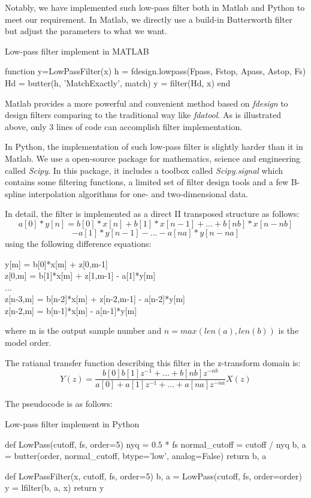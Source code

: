 \documentclass[conference]{IEEEtran}
\begin{document}
Notably, we have implemented such low-pass filter both in Matlab and Python to meet our requirement.
In Matlab, we directly use a build-in Butterworth filter but adjust the parameters to what we want.
\begin{algorithm}
	\caption{Low-pass filter implement in MATLAB}
	\begin{algorithmic}
	\STATE function y=LowPassFilter(x) 
	\STATE \qquad h = fdesign.lowpass(Fpass, Fstop, Apass, Astop, Fs) 
	\STATE \qquad Hd = butter(h, 'MatchExactly', match) 
	\STATE \qquad y = filter(Hd, x) 
	\STATE end
	\end{algorithmic}
\end{algorithm}
Matlab provides a more powerful and convenient method based on \emph{fdesign} to design filters comparing to the traditional way like \emph{fdatool}. As is illustrated above, only 3 lines of code can accomplish filter implementation.

In Python, the implementation of such low-pass filter is slightly harder than it in Matlab. We use a open-source package for mathematics, science and engineering called \emph{Scipy}. In this package, it includes a toolbox called \emph{Scipy.signal} which contains some filtering functions, a limited set of filter design tools and a few B-spline interpolation algorithms for one- and two-dimensional data.

In detail, the filter is implemented as a direct II transposed structure as follows:
$$a[0]*y[n] = b[0]*x[n] + b[1]*x[n-1] + ... + b[nb]*x[n-nb]$$
                        $$- a[1]*y[n-1] - ... - a[na]*y[n-na]$$
using the following difference equations:
\begin{algorithm}[H]
y[m] = b[0]*x[m] + z[0,m-1] \\
z[0,m] = b[1]*x[m] + z[1,m-1] - a[1]*y[m]\\
...\\
z[n-3,m] = b[n-2]*x[m] + z[n-2,m-1] - a[n-2]*y[m]\\
z[n-2,m] = b[n-1]*x[m] - a[n-1]*y[m]\\
\end{algorithm}
where m is the output sample number and $n=max(len(a), len(b))$ is the model order.

The ratianal transfer function describing this filter in the z-transform domain is:
$$Y(z) = \frac{b[0]b[1]z^{-1}+...+b[nb]z^{-nb}}{a[0]+a[1]z^{-1}+...+a[na]z^{-na}}X(z)$$

The pseudocode is as follows:
\begin{algorithm}
	\caption{Low-pass filter implement in Python}
	\begin{algorithmic}
	\STATE def LowPass(cutoff, fs, order=5) 
	\STATE \qquad nyq = $0.5$ * fs
	\STATE \qquad normal\_cutoff = cutoff / nyq
	\STATE \qquad b, a = butter(order, normal\_cutoff, 
	\STATE \qquad \qquad \qquad \qquad btype='low', analog=False)
	\STATE \qquad return b, a

	\STATE def LowPassFilter(x, cutoff, fs, order=5) 
	\STATE \qquad b, a = LowPass(cutoff, fs, order=order)
	\STATE \qquad y = lfilter(b, a, x)
	\STATE \qquad return y
	\end{algorithmic}
\end{algorithm}
\end{document}
